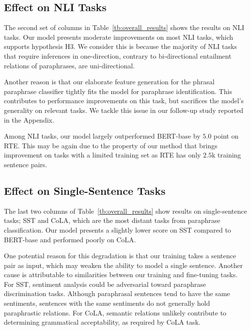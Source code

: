 \documentclass[11pt,a4paper]{article}
\newcommand{\Tref}[1]{Table~\ref{#1}}
\begin{document}
\subsection{Effect on NLI Tasks}
\label{sec:nli}
The second set of columns in \Tref{tb:overall_results} shows the results on NLI tasks. 
Our model presents moderate improvements on most NLI tasks, which supports hypothesis H3. 
We consider this is because the majority of NLI tasks that require inferences in one-direction, contrary to bi-directional entailment relations of paraphrases, are uni-directional.  


Another reason is that our elaborate feature generation for the phrasal paraphrase classifier tightly fits the model for paraphrase identification. 
This contributes to performance improvements on this task, but sacrifices the model's generality on relevant tasks. 
We tackle this issue in our follow-up study reported in the Appendix.


Among NLI tasks, our model largely outperformed BERT-base by $5.0$ point on RTE.
This may be again due to the property of our method that brings improvement on tasks with a limited training set as RTE has only $2.5$k training sentence pairs.

\subsection{Effect on Single-Sentence Tasks}
The last two columns of \Tref{tb:overall_results} show results on single-sentence tasks; SST and CoLA, which are the most distant tasks from paraphrase classification. 
Our model presents a slightly lower score on SST compared to BERT-base and performed poorly on CoLA. %


One potential reason for this degradation is that our training takes a sentence pair as input, which may weaken the ability to model a single sentence. 
Another cause is attributable to similarities between our training and fine-tuning tasks. 
For SST, sentiment analysis could be adversarial toward paraphrase discrimination tasks. 
Although paraphrasal sentences tend to have the same sentiments, sentences with the same sentiments do not generally hold paraphrastic relations.
For CoLA, semantic relations unlikely contribute to determining grammatical acceptability, as required by CoLA task. 
\end{document}
